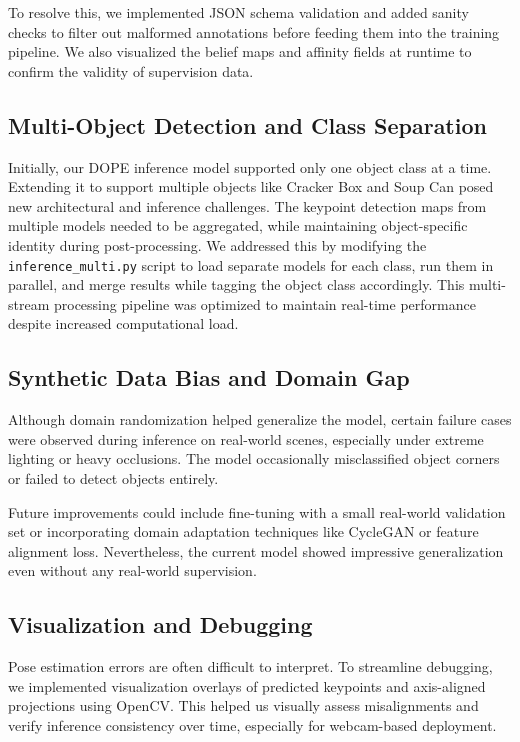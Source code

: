 \documentclass[conference]{IEEEtran}
\begin{document}
To resolve this, we implemented JSON schema validation and added sanity checks to filter out malformed annotations before feeding them into the training pipeline. We also visualized the belief maps and affinity fields at runtime to confirm the validity of supervision data.

\subsection{Multi-Object Detection and Class Separation}
Initially, our DOPE inference model supported only one object class at a time. Extending it to support multiple objects like Cracker Box and Soup Can posed new architectural and inference challenges. The keypoint detection maps from multiple models needed to be aggregated, while maintaining object-specific identity during post-processing.
We addressed this by modifying the \texttt{inference\_multi.py} script to load separate models for each class, run them in parallel, and merge results while tagging the object class accordingly. This multi-stream processing pipeline was optimized to maintain real-time performance despite increased computational load.

\subsection{Synthetic Data Bias and Domain Gap}
Although domain randomization helped generalize the model, certain failure cases were observed during inference on real-world scenes, especially under extreme lighting or heavy occlusions. The model occasionally misclassified object corners or failed to detect objects entirely.

Future improvements could include fine-tuning with a small real-world validation set or incorporating domain adaptation techniques like CycleGAN or feature alignment loss. Nevertheless, the current model showed impressive generalization even without any real-world supervision.

\subsection{Visualization and Debugging}
Pose estimation errors are often difficult to interpret. To streamline debugging, we implemented visualization overlays of predicted keypoints and axis-aligned projections using OpenCV. This helped us visually assess misalignments and verify inference consistency over time, especially for webcam-based deployment.
\end{document}

